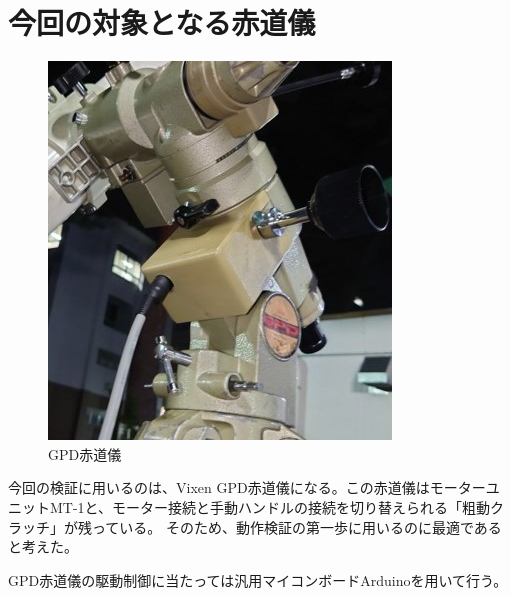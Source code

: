 \documentclass[../../main]{subfiles}
\begin{document}
\section{今回の対象となる赤道儀}
\begin{figure}
  \centering
  \includegraphics[width=.3\textwidth]{GPD.jpg}
  \caption{GPD赤道儀}
  \label{fig:GPD}
\end{figure}
今回の検証に用いるのは、Vixen GPD赤道儀になる。この赤道儀はモーターユニットMT-1と、モーター接続と手動ハンドルの接続を切り替えられる「粗動クラッチ」が残っている。
そのため、動作検証の第一歩に用いるのに最適であると考えた。

GPD赤道儀の駆動制御に当たっては汎用マイコンボードArduinoを用いて行う。
\end{document}
